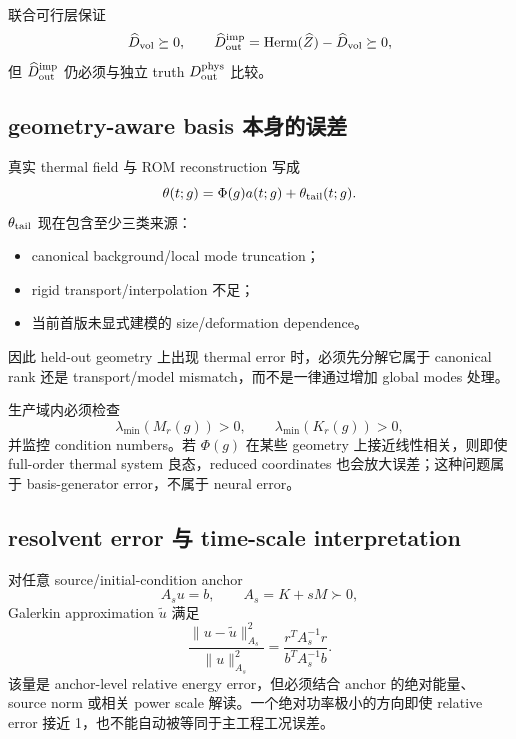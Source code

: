 联合可行层保证
\begin{equation}
\widehat D_{\rm vol}\succeq0,
\qquad
\widehat D_{\rm out}^{\rm imp}
=\operatorname{Herm}(\widehat Z)-\widehat D_{\rm vol}\succeq0,
\end{equation}
但 $\widehat D_{\rm out}^{\rm imp}$ 仍必须与独立 truth $D_{\rm out}^{\rm phys}$ 比较。

\subsection{geometry-aware basis 本身的误差}
真实 thermal field 与 ROM reconstruction 写成
\begin{equation}
\theta(t;g)=\Phi(g)a(t;g)+\theta_{\rm tail}(t;g).
\end{equation}
$\theta_{\rm tail}$ 现在包含至少三类来源：
\begin{itemize}
  \item canonical background/local mode truncation；
  \item rigid transport/interpolation 不足；
  \item 当前首版未显式建模的 size/deformation dependence。
\end{itemize}
因此 held-out geometry 上出现 thermal error 时，必须先分解它属于 canonical rank 还是 transport/model mismatch，而不是一律通过增加 global modes 处理。

生产域内必须检查
\begin{equation}
\lambda_{\min}(M_r(g))>0,
\qquad
\lambda_{\min}(K_r(g))>0,
\end{equation}
并监控 condition numbers。若 $\Phi(g)$ 在某些 geometry 上接近线性相关，则即使 full-order thermal system 良态，reduced coordinates 也会放大误差；这种问题属于 basis-generator error，不属于 neural error。

\subsection{resolvent error 与 time-scale interpretation}
对任意 source/initial-condition anchor
\begin{equation}
A_su=b,
\qquad A_s=K+sM\succ0,
\end{equation}
Galerkin approximation $\tilde u$ 满足
\begin{equation}
\boxed{
\frac{\|u-\tilde u\|_{A_s}^2}{\|u\|_{A_s}^2}
=\frac{r^TA_s^{-1}r}{b^TA_s^{-1}b}.
}
\end{equation}
该量是 anchor-level relative energy error，但必须结合 anchor 的绝对能量、source norm 或相关 power scale 解读。一个绝对功率极小的方向即使 relative error 接近 1，也不能自动被等同于主工程工况误差。

